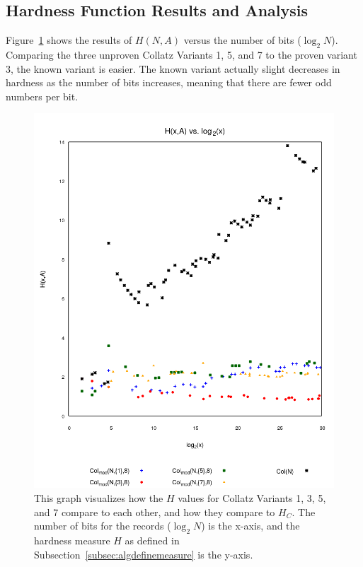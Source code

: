 \subsection{Hardness Function Results and Analysis} \label{subsubsec:algsinhardness}
Figure~\ref{fig:hvslog} shows the results of $H(N,A)$ versus the number of bits ($\log_2{N}$). Comparing the three unproven Collatz Variants 1, 5, and 7 to the proven variant 3, the known variant is easier. The known variant actually slight decreases in hardness as the number of bits increases, meaning that there are fewer odd numbers per bit. \par
\begin{figure}
    \centering
    \includegraphics[scale=0.6]{ModAvoidanceAnalysisPics/H_vs_log.png}
    \caption{This graph visualizes how the $H$ values for Collatz Variants 1, 3, 5, and 7 compare to each other, and how they compare to $H_C$. The number of bits for the records ($\log_2{N}$) is the x-axis, and the hardness measure $H$ as defined in Subsection~\ref{subsec:algdefinemeasure} is the y-axis.}
    \label{fig:hvslog}
\end{figure}

